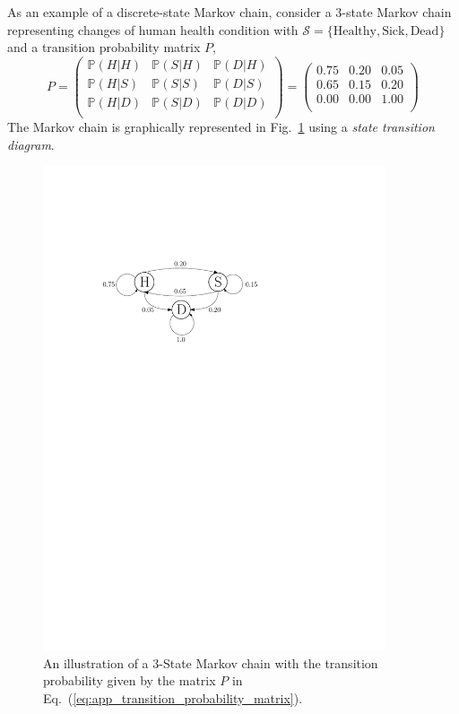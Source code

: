 As an example of a discrete-state Markov chain, consider a $3$-state Markov chain representing changes of human health condition with $\mathcal{S} = \{\text{Healthy}, \text{Sick}, \text{Dead}\}$ and a transition probability matrix $P$,
\begin{equation}
  P =  
    \begin{pmatrix}
      \mathbb{P}(H | H)  & \mathbb{P}(S | H) & \mathbb{P}(D | H)\\
      \mathbb{P}(H | S)  & \mathbb{P}(S | S) & \mathbb{P}(D | S)\\
      \mathbb{P}(H | D)  & \mathbb{P}(S | D) & \mathbb{P}(D | D)\\
    \end{pmatrix} =
		\begin{pmatrix}
		  0.75  & 0.20 & 0.05\\
      0.65  & 0.15 & 0.20\\
      0.00  & 0.00 & 1.00\\
		\end{pmatrix}
\label{eq:app_transition_probability_matrix}
\end{equation}
The Markov chain is graphically represented in Fig.~\ref{fig:app_markov_chain} using a \emph{state transition diagram}.
\begin{figure}[bth]
	\centering
	\includegraphics[width=0.9\textwidth]{../figures/chapter5/figures/markov_chain.pdf}
	\caption[Illustration of a $3$-State Markov Chain]{An illustration of a $3$-State Markov chain with the transition probability given by the matrix $P$ in Eq.~(\ref{eq:app_transition_probability_matrix}).}
	\label{fig:app_markov_chain}
\end{figure}


